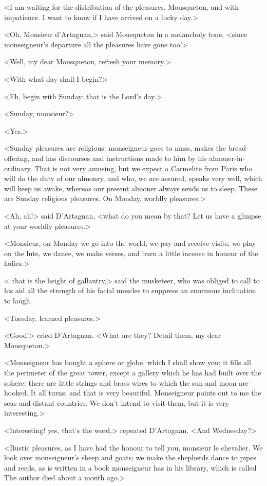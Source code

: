 <I am waiting for the distribution of the pleasures, Mousqueton, and with impatience. I want to know if I have arrived on a lucky day.>

<Oh, Monsieur d'Artagnan,> said Mousqueton in a melancholy tone, <since monseigneur's departure all the pleasures have gone too!>

<Well, my dear Mousqueton, refresh your memory.>

<With what day shall I begin?>

<Eh,  begin with Sunday; that is the Lord's day.>

<Sunday, monsieur?>

<Yes.>

<Sunday pleasures are religious: monseigneur goes to mass, makes the bread-offering, and has discourses and instructions made to him by his almoner-in-ordinary. That is not very amusing, but we expect a Carmelite from Paris who will do the duty of our almonry, and who, we are assured, speaks very well, which will keep us awake, whereas our present almoner always sends us to sleep. These are Sunday religious pleasures. On Monday, worldly pleasures.>

<Ah, ah!> said D'Artagnan, <what do you mean by that? Let us have a glimpse at your worldly pleasures.>

<Monsieur, on Monday we go into the world; we pay and receive visits, we play on the lute, we dance, we make verses, and burn a little incense in honour of the ladies.>

< that is the height of gallantry,> said the musketeer, who was obliged to call to his aid all the strength of his facial muscles to suppress an enormous inclination to laugh.

<Tuesday, learned pleasures.>

<Good!> cried D'Artagnan. <What are they? Detail them, my dear Mousqueton.>

<Monseigneur has bought a sphere or globe, which I shall show you; it fills all the perimeter of the great tower, except a gallery which he has had built over the sphere: there are little strings and brass wires to which the sun and moon are hooked. It all turns; and that is very beautiful. Monseigneur points out to me the seas and distant countries. We don't intend to visit them, but it is very interesting.>

<Interesting! yes, that's the word,> repeated D'Artagnan. <And Wednesday?>

<Rustic pleasures, as I have had the honour to tell you, monsieur le chevalier. We look over monseigneur's sheep and goats; we make the shepherds dance to pipes and reeds, as is written in a book monseigneur has in his library, which is called  The author died about a month ago.>

